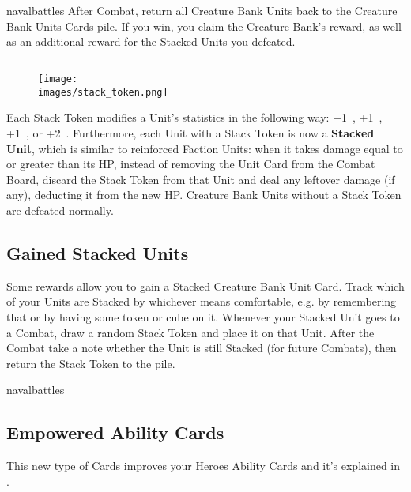 \begin{multicols*}{2}
\begin{expansion}[before=\vspace*{-11mm}]{navalbattles}
    After Combat, return all Creature Bank Units back to the Creature Bank Units Cards pile.
    If you win, you claim the Creature Bank's reward, as well as an additional reward for the Stacked Units you defeated.

    \subsection*{}
        \setlength\intextsep{0pt}
        \setlength\columnsep{1em}
        \begin{wrapfigure}{r}{0.2\linewidth}
            \texttt{[image: \\images/stack\_token.png]}
        \end{wrapfigure}
    Each Stack Token modifies a Unit's statistics in the following way: +1~, +1~, +1~, or +2~.
    Furthermore, each Unit with a Stack Token is now a \textbf{Stacked Unit}, which is similar to reinforced Faction Units: when it takes damage equal to or greater than its HP, instead of removing the Unit Card from the Combat Board, discard the Stack Token from that Unit and deal any leftover damage (if any), deducting it from the new HP.
    Creature Bank Units without a Stack Token are defeated normally.

    \subsection*{Gained Stacked Units}
    Some rewards allow you to gain a Stacked Creature Bank Unit Card.
    Track which of your Units are Stacked by whichever means comfortable, e.g. by remembering that or by having some token or cube on it.
    Whenever your Stacked Unit goes to a Combat, draw a random Stack Token and place it on that Unit.
    After the Combat take a note whether the Unit is still Stacked (for future Combats), then return the Stack Token to the pile.
\end{expansion}

\vspace*{1em}
\begin{expansion}[before=\vspace*{-11mm}]{navalbattles}
    \subsection*{Empowered Ability Cards}
    This new type of Cards improves your Heroes Ability Cards and it's explained in .


\end{expansion}
\end{multicols*}
